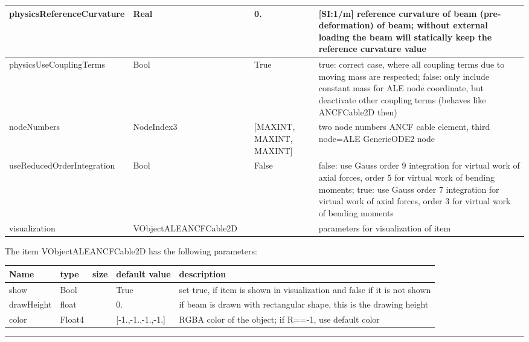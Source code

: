 \begin{center}
\begin{longtable}{| p{4.5cm} | p{2.5cm} | p{0.5cm} | p{2.5cm} | p{6cm} |}
    physicsReferenceCurvature &     Real &      &     0. &      [SI:1/m] reference curvature of beam (pre-deformation) of beam; without external loading the beam will statically keep the reference curvature value\\ \hline
    physicsUseCouplingTerms &     Bool &      &     True &     true: correct case, where all coupling terms due to moving mass are respected; false: only include constant mass for ALE node coordinate, but deactivate other coupling terms (behaves like ANCFCable2D then)\\ \hline
    nodeNumbers &     NodeIndex3 &      &     [MAXINT, MAXINT, MAXINT] &     two node numbers ANCF cable element, third node=ALE GenericODE2 node\\ \hline
    useReducedOrderIntegration &     Bool &      &     False &     false: use Gauss order 9 integration for virtual work of axial forces, order 5 for virtual work of bending moments; true: use Gauss order 7 integration for virtual work of axial forces, order 3 for virtual work of bending moments\\ \hline
    visualization & VObjectALEANCFCable2D & & & parameters for visualization of item \\ \hline
	  \end{longtable}
	\end{center}
The item VObjectALEANCFCable2D has the following parameters:\vspace{-1cm}\\ 
\begin{center}
  \footnotesize
  \begin{longtable}{| p{4.5cm} | p{2.5cm} | p{0.5cm} | p{2.5cm} | p{6cm} |}
    \hline
    \bf Name & \bf type & \bf size & \bf default value & \bf description \\ \hline
    show &     Bool &      &     True &     set true, if item is shown in visualization and false if it is not shown\\ \hline
    drawHeight &     float &      &     0. &     if beam is drawn with rectangular shape, this is the drawing height\\ \hline
    color &     Float4 &      &     [-1.,-1.,-1.,-1.] &     RGBA color of the object; if R==-1, use default color\\ \hline
	  \end{longtable}
	\end{center}
\par\noindent\rule{\textwidth}{0.4pt}
\label{description_ObjectALEANCFCable2D}
